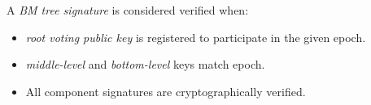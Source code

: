 A \emph{BM tree signature} is considered verified when:
\begin{itemize}
	\item{\emph{root voting public key} is registered to participate in the given epoch.}
	\item{\emph{middle-level} and \emph{bottom-level} keys match epoch.}
	\item{All component signatures are cryptographically verified.}
\end{itemize}
